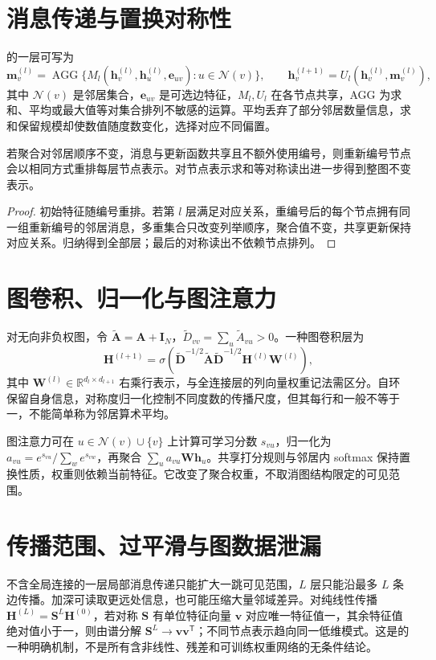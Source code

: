 \documentclass[UTF8,12pt,a4paper,fontset=fandol]{ctexbook}
\begin{document}
\section{消息传递与置换对称性}
的一层可写为
\[
\mathbf m_v^{(l)}=\operatorname{AGG}\{M_l(\mathbf h_v^{(l)},\mathbf h_u^{(l)},\mathbf e_{uv}):u\in\mathcal N(v)\},\qquad
\mathbf h_v^{(l+1)}=U_l(\mathbf h_v^{(l)},\mathbf m_v^{(l)}),
\]
其中 $\mathcal N(v)$ 是邻居集合，$\mathbf e_{uv}$ 是可选边特征，$M_l,U_l$ 在各节点共享，AGG 为求和、平均或最大值等对集合排列不敏感的运算。平均丢弃了部分邻居数量信息，求和保留规模却使数值随度数变化，选择对应不同偏置。

\begin{proposition}[消息传递的置换性质]
若聚合对邻居顺序不变，消息与更新函数共享且不额外使用编号，则重新编号节点会以相同方式重排每层节点表示。对节点表示求和等对称读出进一步得到整图不变表示。
\end{proposition}
\begin{proof}
初始特征随编号重排。若第 $l$ 层满足对应关系，重编号后的每个节点拥有同一组重新编号的邻居消息，多重集合只改变列举顺序，聚合值不变，共享更新保持对应关系。归纳得到全部层；最后的对称读出不依赖节点排列。
\end{proof}

\section{图卷积、归一化与图注意力}
对无向非负权图，令 $\widetilde{\mathbf A}=\mathbf A+\mathbf I_N$，$\widetilde D_{vv}=\sum_u\widetilde A_{vu}>0$。一种图卷积层\cite{kipf2016}为
\begin{equation}
\mathbf H^{(l+1)}=\sigma\!\left(\widetilde{\mathbf D}^{-1/2}\widetilde{\mathbf A}\widetilde{\mathbf D}^{-1/2}\mathbf H^{(l)}\mathbf W^{(l)}\right),
\label{eq:dl-graph-convolution}
\end{equation}
其中 $\mathbf W^{(l)}\in\mathbb R^{d_l\times d_{l+1}}$ 右乘行表示，与全连接层的列向量权重记法需区分。自环保留自身信息，对称度归一化控制不同度数的传播尺度，但其每行和一般不等于一，不能简单称为邻居算术平均。

图注意力可在 $u\in\mathcal N(v)\cup\{v\}$ 上计算可学习分数 $s_{vu}$，归一化为 $a_{vu}=e^{s_{vu}}/\sum_we^{s_{vw}}$，再聚合 $\sum_ua_{vu}\mathbf W\mathbf h_u$。共享打分规则与邻居内 softmax 保持置换性质，权重则依赖当前特征。它改变了聚合权重，不取消图结构限定的可见范围。

\section{传播范围、过平滑与图数据泄漏}
不含全局连接的一层局部消息传递只能扩大一跳可见范围，$L$ 层只能沿最多 $L$ 条边传播。加深可读取更远处信息，也可能压缩大量邻域差异。对纯线性传播 $\mathbf H^{(L)}=\mathbf S^L\mathbf H^{(0)}$，若对称 $\mathbf S$ 有单位特征向量 $\mathbf v$ 对应唯一特征值一，其余特征值绝对值小于一，则由谱分解 $\mathbf S^L\to\mathbf v\mathbf v^\mathsf T$；不同节点表示趋向同一低维模式。这是的一种明确机制，不是所有含非线性、残差和可训练权重网络的无条件结论。
\end{document}
